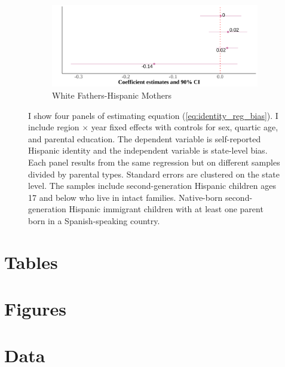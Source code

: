 \documentclass[12pt,english]{article}
\begin{document}
\begin{center}
\begin{figure}[!htb]
\begin{subfigure}{.48\textwidth}
\caption{White Fathers-Hispanic Mothers}
\centering
\includegraphics[width=.9\linewidth]{figure/msa-by-parents-regs-wh.png}
\end{subfigure}
\caption*{\footnotesize{I show four panels of estimating equation (\ref{eq:identity_reg_bias}). I include region $\times$ year fixed effects with controls for sex, quartic age, and parental education. The dependent variable is self-reported Hispanic identity and the independent variable is state-level bias. Each panel results from the same regression but on different samples divided by parental types. Standard errors are clustered on the state level. The samples include second-generation Hispanic children ages 17 and below who live in intact families. Native-born second-generation Hispanic immigrant children with at least one parent born in a Spanish-speaking country.}}
\end{figure}
\end{center}

\pagebreak
\newpage










\pagebreak
\begingroup
{}
\setlength\bibitemsep{0pt}
\printbibliography
\endgroup
\pagebreak

\begin{appendices}

\section{Tables}\label{appendix:tabs}

% 

\section{Figures}\label{appendix:figs}



\section{Data} %
\label{sec:data-ap}


\end{appendices}
\end{document}
